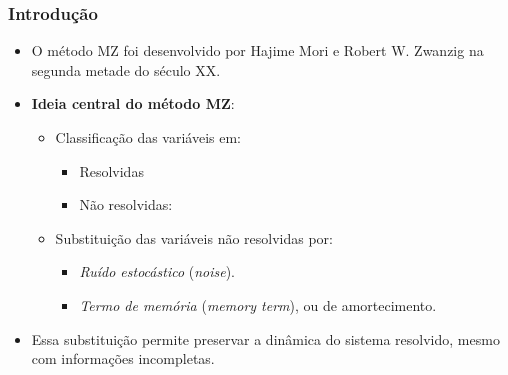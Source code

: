 \begin{frame}\frametitle{Introdução}
	\begin{itemize}
		\item O método MZ foi desenvolvido por Hajime Mori e Robert W. Zwanzig na segunda metade do século XX.
		          
		\item \textbf{Ideia central do método MZ}:
		      \begin{itemize}
		      	\item Classificação das variáveis em:
		      	      \begin{itemize}
		      	      	\item Resolvidas
		      	      	\item Não resolvidas:
		      	      \end{itemize}
		      	\item Substituição das variáveis não resolvidas por:
		      	      \begin{itemize}
		      	      	\item \textit{Ruído estocástico} (\textit{noise}).
		      	      	\item \textit{Termo de memória} (\textit{memory term}), ou de amortecimento.
		      	      \end{itemize}
		      \end{itemize}
		          
		\item Essa substituição permite preservar a dinâmica do sistema resolvido, mesmo com informações incompletas.
	\end{itemize}
\end{frame}


